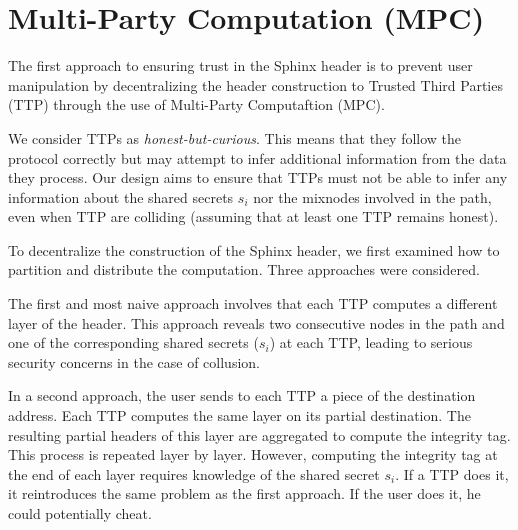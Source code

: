 \newpage
\section{Multi-Party Computation (MPC)}

The first approach to ensuring trust in the Sphinx header is to prevent user manipulation by decentralizing the header construction to Trusted Third Parties (TTP) through the use of Multi-Party Computaftion (MPC).

We consider TTPs as \textit{honest-but-curious}.
This means that they follow the protocol correctly but may attempt to infer additional information from the data they process.
Our design aims to ensure that TTPs must not be able to infer any information about the shared secrets $s_i$ nor the mixnodes involved in the path, even when TTP are colliding (assuming that at least one TTP remains honest).
\newline



To decentralize the construction of the Sphinx header, we first examined how to partition and distribute the computation. 
Three approaches were considered.

The first and most naive approach involves that each TTP computes a different layer of the header. 
This approach reveals two consecutive nodes in the path and one of the corresponding shared secrets ($s_i$) at each TTP, leading to serious security concerns in the case of collusion.

In a second approach, the user sends to each TTP a piece of the destination address.
Each TTP computes the same layer on its partial destination.
The resulting partial headers of this layer are aggregated to compute the integrity tag. 
This process is repeated layer by layer. 
However, computing the integrity tag at the end of each layer requires knowledge of the shared secret $s_i$. 
If a TTP does it, it reintroduces the same problem as the first approach.
If the user does it, he could potentially cheat.

